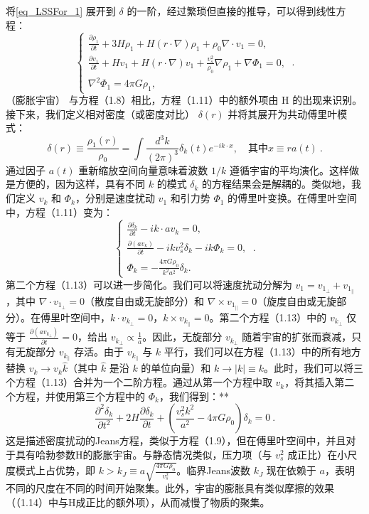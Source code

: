 将\autoref{eq_LSSFor_1} 展开到 \( \delta \) 的一阶，经过繁琐但直接的推导，可以得到线性方程：
\[ \begin{cases} 
\frac{\partial \rho_1}{\partial t} + 3H\rho_1 + H(r \cdot \nabla)\rho_1 + \rho_0\nabla \cdot v_1 = 0, \\
\frac{\partial v_1}{\partial t} + Hv_1 + H(r \cdot \nabla)v_1 + \frac{v_s^2}{\rho_0}\nabla\rho_1 + \nabla\Phi_1 = 0, \\
\nabla^2\Phi_1 = 4\pi G\rho_1,
\end{cases} ~.\]
（膨胀宇宙）
与方程（1.8）相比，方程（1.11）中的额外项由 H 的出现来识别。接下来，我们定义相对密度（或密度对比） \( \delta(r) \) 并将其展开为共动傅里叶模式：
\[ \delta(r) \equiv \frac{\rho_1(r)}{\rho_0} = \int \frac{d^3k}{(2\pi)^3} \delta_k(t) e^{-ik \cdot x}, \quad \text{其中} x \equiv r a(t)~. \]
通过因子 \( a(t) \) 重新缩放空间向量意味着波数 \( 1/k \) 遵循宇宙的平均演化。这样做是方便的，因为这样，具有不同 \( k \) 的模式 \( \delta_k \) 的方程结果会是解耦的。类似地，我们定义 \( v_k \) 和 \( \Phi_k \)，分别是速度扰动 \( v_1 \) 和引力势 \( \Phi_1 \) 的傅里叶变换。在傅里叶空间中，方程（1.11）变为：
\[ \begin{cases} 
\frac{\partial \delta_k}{\partial t} - ik \cdot a v_k = 0, \\
\frac{\partial (a v_k)}{\partial t} - ik v_s^2 \delta_k - ik \Phi_k = 0, \\
\Phi_k = -\frac{4\pi G \rho_0}{k^2 a^2} \delta_k.
\end{cases} ~.\]
第二个方程（1.13）可以进一步简化。我们可以将速度扰动分解为 \( v_1 = v_1_\perp + v_1_\parallel \)，其中 \( \nabla \cdot v_1_\perp = 0 \)（散度自由或无旋部分）和 \( \nabla \times v_1_\parallel = 0 \)（旋度自由或无旋部分）。在傅里叶空间中，\( k \cdot v_{k_\perp} = 0 \)，\( k \times v_{k_\parallel} = 0 \)。第二个方程（1.13）中的 \( v_{k_\perp} \) 仅等于 \( \frac{\partial (a v_{k_\perp})}{\partial t} = 0 \)，给出 \( v_{k_\perp} \propto \frac{1}{a} \)。因此，无旋部分 \( v_{k_\perp} \) 随着宇宙的扩张而衰减，只有无旋部分 \( v_{k_\parallel} \) 存活。由于 \( v_{k_\parallel} \) 与 \( k \) 平行，我们可以在方程（1.13）中的所有地方替换 \( v_k \rightarrow v_k \hat{k} \)（其中 \( \hat{k} \) 是沿 \( k \) 的单位向量）和 \( k \rightarrow |k| \equiv k \)。此时，我们可以将三个方程（1.13）合并为一个二阶方程。通过从第一个方程中取 \( v_k \)，将其插入第二个方程，并使用第三个方程中的 \( \Phi_k \)，我们得到：**
\[ \frac{\partial^2 \delta_k}{\partial t^2} + 2H \frac{\partial \delta_k}{\partial t} + \left( \frac{v_s^2 k^2}{a^2} - 4\pi G\rho_0 \right) \delta_k = 0~. \]
这是描述密度扰动的Jeans方程，类似于方程（1.9），但在傅里叶空间中，并且对于具有哈勃参数H的膨胀宇宙。与静态情况类似，压力项（与 \( v_s^2 \) 成正比）在小尺度模式上占优势，即 \( k > k_J \equiv a \sqrt{\frac{4\pi G\rho_0}{v_s^2}} \)。临界Jeans波数 \( k_J \) 现在依赖于 \( a \)，表明不同的尺度在不同的时间开始聚集。此外，宇宙的膨胀具有类似摩擦的效果（（1.14）中与H成正比的额外项），从而减慢了物质的聚集。




 

